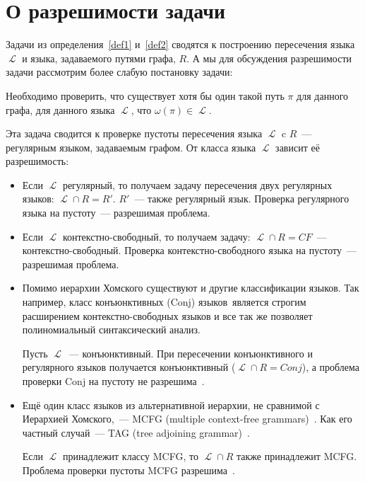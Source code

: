 \section{О разрешимости задачи}

Задачи из определения~\ref{def1} и~\ref{def2} сводятся к построению пересечения языка $\mscrL$ и языка, задаваемого путями графа, $R$.
А мы для обсуждения разрешимости задачи рассмотрим более слабую постановку задачи:

\begin{definition}
    Необходимо проверить, что существует хотя бы один такой путь $\pi$ для данного графа, для данного языка $\mscrL$, что $\omega(\pi) \in \mscrL$.
\end{definition}

Эта задача сводится к проверке пустоты пересечения языка $\mscrL$ c $R$~--- регулярным языком, задаваемым графом.
От класса языка $\mscrL$ зависит её разрешимость:
\begin{itemize}
    \item Если $\mscrL$ регулярный, то получаем задачу пересечения двух регулярных языков: $\mscrL \cap R = R'$.
          $R'$~--- также регулярный язык.
          Проверка регулярного языка на пустоту~--- разрешимая проблема.
    \item Если $\mscrL$ контекстно-свободный, то получаем задачу: $\mscrL \cap R = CF$~--- контекстно-свободный.
          Проверка контекстно-свободного языка на пустоту~--- разрешимая проблема.
    \item Помимо иерархии Хомского существуют и другие классификации языков.
          Так например, класс конъюнктивных (Conj) языков~является строгим расширением контекстно-свободных языков и все так же позволяет полиномиальный синтаксический анализ.

          Пусть $\mscrL$~--- конъюнктивный.
          При пересечении конъюнктивного и регулярного языков получается конъюнктивный ($\mscrL \cap R = Conj$), а проблема проверки Conj на пустоту не разрешима~.
    \item Ещё один класс языков из альтернативной иерархии, не сравнимой с Иерархией Хомского,~--- MCFG (multiple context-free grammars)~.
          Как его частный случай~--- TAG (tree adjoining grammar)~.

          Если $\mscrL$ принадлежит классу MCFG, то $\mscrL \cap R$ также принадлежит MCFG.
          Проблема проверки пустоты MCFG разрешима~.
\end{itemize}

